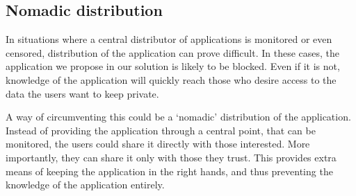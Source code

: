 \subsection{Nomadic distribution}
In situations where a central distributor of applications is monitored or even censored, distribution of the application can prove difficult.
In these cases, the application we propose in our solution is likely to be blocked.
Even if it is not, knowledge of the application will quickly reach those who desire access to the data the users want to keep private.

A way of circumventing this could be a `nomadic' distribution of the application.
Instead of providing the application through a central point, that can be monitored, the users could share it directly with those interested.
More importantly, they can share it only with those they trust.
This provides extra means of keeping the application in the right hands, and thus preventing the knowledge of the application entirely.  